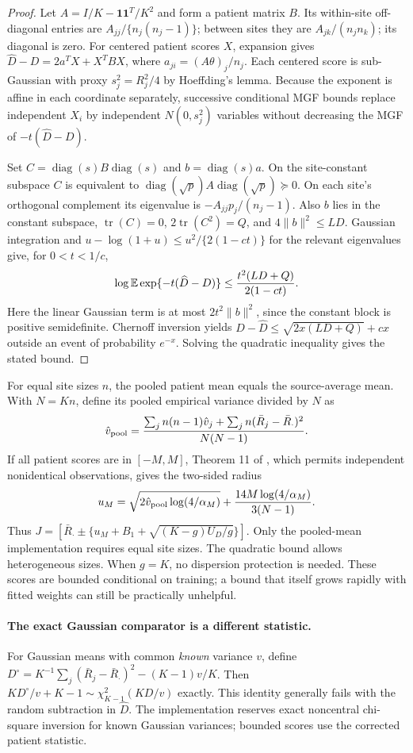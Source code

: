 \begin{proof}
Let $A=I/K-\boldsymbol1\boldsymbol1^T/K^2$ and form a patient matrix $B$.
Its within-site off-diagonal entries are $A_{jj}/\{n_j(n_j-1)\}$;
between sites they are $A_{jk}/(n_jn_k)$; its diagonal is zero.
For centered patient scores $X$, expansion gives
$\widehat D-D=2a^TX+X^TBX$, where $a_{ji}=(A\theta)_j/n_j$.
Each centered score is sub-Gaussian with proxy $s_j^2=R_j^2/4$ by
Hoeffding's lemma. Because the exponent is affine in each coordinate
separately, successive conditional MGF bounds replace independent $X_i$
by independent $N(0,s_j^2)$ variables without decreasing the MGF of
$-t(\widehat D-D)$.

Set $C=\operatorname{diag}(s)B\operatorname{diag}(s)$ and
$b=\operatorname{diag}(s)a$. On the site-constant subspace $C$ is equivalent
to $\operatorname{diag}(\sqrt p)A\operatorname{diag}(\sqrt p)\succeq0$.
On each site's orthogonal complement its eigenvalue is
$-A_{jj}p_j/(n_j-1)$. Also $b$ lies in the constant subspace,
$\operatorname{tr}(C)=0$, $2\operatorname{tr}(C^2)=Q$, and
$4\|b\|^2\le LD$. Gaussian integration and
$u-\log(1+u)\le u^2/\{2(1-ct)\}$ for the relevant eigenvalues give,
for $0<t<1/c$,
\[
 \log\mathbb E\exp\{-t(\widehat D-D)\}
 \le\frac{t^2(LD+Q)}{2(1-ct)}.
\]
Here the linear Gaussian term is at most $2t^2\|b\|^2$, since the
constant block is positive semidefinite. Chernoff inversion yields
$D-\widehat D\le\sqrt{2x(LD+Q)}+cx$ outside an event of probability
$e^{-x}$. Solving the quadratic inequality gives the stated bound.
\end{proof}

For equal site sizes $n$, the pooled patient mean equals the source-average
mean. With $N=Kn$, define its pooled empirical variance divided by $N$ as
\[
 \hat v_{\rm pool}=\frac{
   \sum_j n(n-1)\hat v_j+\sum_jn(\bar R_j-\bar R_\cdot)^2}{N(N-1)}.
\]
If all patient scores are in $[-M,M]$, Theorem 11 of
\citet{maurer2009}, which permits independent nonidentical observations,
gives the two-sided radius
\[
 u_M=\sqrt{2\hat v_{\rm pool}\log(4/\alpha_M)}
       +\frac{14M\log(4/\alpha_M)}{3(N-1)}.
\]
Thus $J=[\bar R_\cdot\pm\{u_M+B_1+\sqrt{(K-g)U_D/g}\}]$.
Only the pooled-mean implementation requires equal site sizes. The quadratic
bound allows heterogeneous sizes. When $g=K$, no dispersion protection is
needed. These scores are bounded conditional on training; a bound that itself
grows rapidly with fitted weights can still be practically unhelpful.

\paragraph{The exact Gaussian comparator is a different statistic.}
For Gaussian means with common \emph{known} variance $v$, define
$D^\circ=K^{-1}\sum_j(\bar R_j-\bar R_\cdot)^2-(K-1)v/K$.
Then $KD^\circ/v+K-1\sim\chi^2_{K-1}(KD/v)$ exactly.
This identity generally fails with the random subtraction in $\widehat D$.
The implementation reserves exact noncentral chi-square inversion for known
Gaussian variances; bounded scores use the corrected patient statistic.

